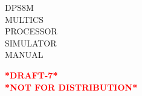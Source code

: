 \thispagestyle{empty}

\begin{flushleft}
	\mybox{\textbf{\Huge \textcolor{white}{HARDWARE}}}
\end{flushleft}

\begin{flushleft}
	\Huge
	\hspace{14ex}DPS8M \\
	\hspace{14ex}MULTICS \\
	\hspace{14ex}PROCESSOR \\
	\hspace{14ex}SIMULATOR \\
	\hspace{14ex}MANUAL
	\begin{center}
	\textbf{\textcolor{red}{*DRAFT-7*}} \\
	\textbf{\textcolor{red}{*NOT FOR DISTRIBUTION*}}
	\end{center}
\end{flushleft}

\vfill
\mybox{
	\begin{flushright}
		{\textbf{\Huge \textcolor{white}{SIMULATOR}}}
	\end{flushright}
}
